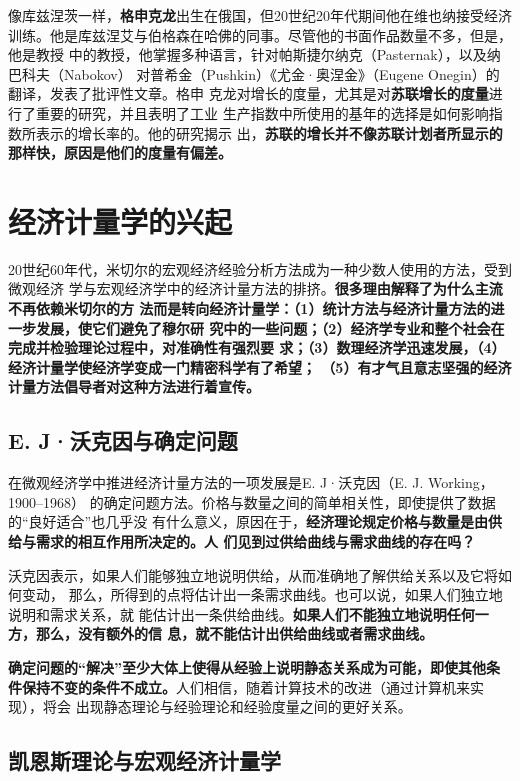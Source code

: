 像库兹涅茨一样，\textbf{格申克龙}出生在俄国，但20世纪20年代期间他在维也纳接受经济
训练。他是库兹涅艾与伯格森在哈佛的同事。尽管他的书面作品数量不多，但是，他是教授
中的教授，他掌握多种语言，针对帕斯捷尔纳克（Pasternak），以及纳巴科夫（Nabokov）
对普希金（Pushkin）《尤金·奥涅金》（Eugene Onegin）的翻译，发表了批评性文章。格申
克龙对增长的度量，尤其是对\textbf{苏联增长的度量}进行了重要的研究，并且表明了工业
生产指数中所使用的基年的选择是如何影响指数所表示的增长率的。他的研究揭示
出，\textbf{苏联的增长并不像苏联计划者所显示的那样快，原因是他们的度量有偏差。}

\section{经济计量学的兴起}

20世纪60年代，米切尔的宏观经济经验分析方法成为一种少数人使用的方法，受到微观经济
学与宏观经济学中的经济计量方法的排挤。\textbf{很多理由解释了为什么主流不再依赖米切尔的方
法而是转向经济计量学：（1）统计方法与经济计量方法的进一步发展，使它们避免了穆尔研
究中的一些问题；（2）经济学专业和整个社会在完成并检验理论过程中，对准确性有强烈要
求；（3）数理经济学迅速发展，（4）经济计量学使经济学变成一门精密科学有了希望；
（5）有才气且意志坚强的经济计量方法倡导者对这种方法进行着宣传。}

\subsection{E. J·沃克因与确定问题}

在微观经济学中推进经济计量方法的一项发展是E. J·沃克因（E. J. Working，1900--1968）
的确定问题方法。价格与数量之间的简单相关性，即使提供了数据的“良好适合”也几乎没
有什么意义，原因在于，\textbf{经济理论规定价格与数量是由供给与需求的相互作用所决定的。人
们见到过供给曲线与需求曲线的存在吗？}

沃克因表示，如果人们能够独立地说明供给，从而准确地了解供给关系以及它将如何变动，
那么，所得到的点将估计出一条需求曲线。也可以说，如果人们独立地说明和需求关系，就
能估计出一条供给曲线。\textbf{如果人们不能独立地说明任何一方，那么，没有额外的信
  息，就不能估计出供给曲线或者需求曲线。}

\textbf{确定问题的“解决”至少大体上使得从经验上说明静态关系成为可能，即使其他条
  件保持不变的条件不成立。}人们相信，随着计算技术的改进（通过计算机来实现），将会
出现静态理论与经验理论和经验度量之间的更好关系。

\subsection{凯恩斯理论与宏观经济计量学}

